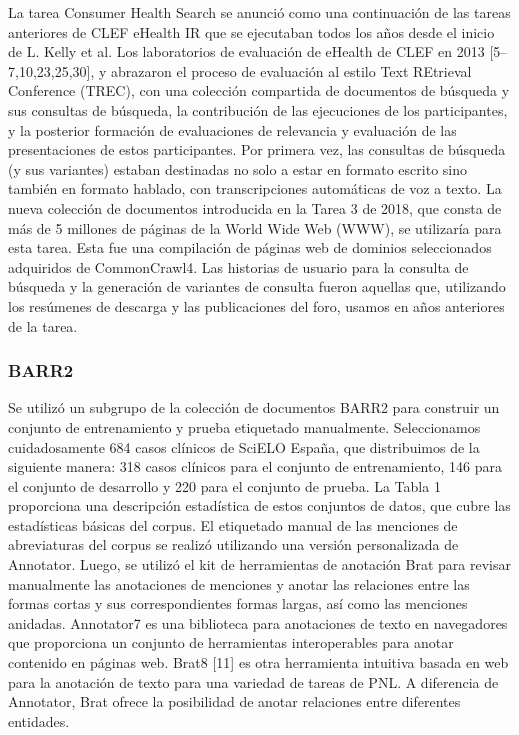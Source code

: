 La tarea Consumer Health Search se anunció como una continuación de las tareas anteriores de CLEF eHealth IR que se ejecutaban todos los años desde el inicio de L. Kelly et al. Los laboratorios de evaluación de eHealth de CLEF en 2013 [5–7,10,23,25,30], y abrazaron el proceso de evaluación al estilo Text REtrieval Conference (TREC), con una colección compartida de documentos de búsqueda y sus consultas de búsqueda, la contribución de las ejecuciones de los participantes, y la posterior formación de evaluaciones de relevancia y evaluación de las presentaciones de estos participantes. Por primera vez, las consultas de búsqueda (y sus variantes) estaban destinadas no solo a estar en formato escrito sino también en formato hablado, con transcripciones automáticas de voz a texto. La nueva colección de documentos introducida en la Tarea 3 de 2018, que consta de más de 5 millones de páginas de la World Wide Web (WWW), se utilizaría para esta tarea. Esta fue una compilación de páginas web de dominios seleccionados adquiridos de CommonCrawl4. Las historias de usuario para la consulta de búsqueda y la generación de variantes de consulta fueron aquellas que, utilizando los resúmenes de descarga y las publicaciones del foro, usamos en años anteriores de la tarea.

\subsubsection*{BARR2}

Se utilizó un subgrupo de la colección de documentos BARR2 para construir un conjunto de entrenamiento y prueba etiquetado manualmente. Seleccionamos cuidadosamente 684 casos clínicos de SciELO España, que distribuimos de la siguiente manera: 318 casos clínicos para el conjunto de entrenamiento, 146 para el conjunto de desarrollo y 220 para el conjunto de prueba. La Tabla 1 proporciona una descripción estadística de estos conjuntos de datos, que cubre las estadísticas básicas del corpus. El etiquetado manual de las menciones de abreviaturas del corpus se realizó utilizando una versión personalizada de Annotator. Luego, se utilizó el kit de herramientas de anotación Brat para revisar manualmente las anotaciones de menciones y anotar las relaciones entre las formas cortas y sus correspondientes formas largas, así como las menciones anidadas. Annotator7 es una biblioteca para anotaciones de texto en navegadores que proporciona un conjunto de herramientas interoperables para anotar contenido en páginas web. Brat8 [11] es otra herramienta intuitiva basada en web para la anotación de texto para una variedad de tareas de PNL. A diferencia de Annotator, Brat ofrece la posibilidad de anotar relaciones entre diferentes entidades.

